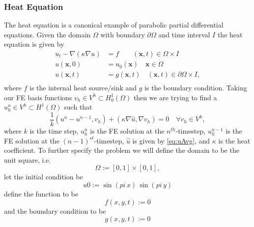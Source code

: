 \subsubsection{Heat Equation} \label{sss:Heat}
    The heat equation is a canonical example of parabolic partial differential
    equations. Given the domain $\Omega$ with boundary $\partial \Omega$ and
    time interval $I$ the heat equation is given by
    \begin{equation}
        \begin{split}
            u_t - \nabla \left( \kappa \nabla u \right) &= f
                \qquad (\mathbf{x}, t)\in \Omega \times I \\
            u(\mathbf{x}, 0) &= u_0(\mathbf{x}) \quad \mathbf{x} \in \Omega \\
            u(\mathbf{x}, t) &= g(\mathbf{x},t) \quad (\mathbf{x}, t)\in
                \partial\Omega \times I, \\
        \end{split}
        \label{eq:Heat}
    \end{equation}
    where $f$ is the internal heat source/sink and $g$ is the boundary
    condition. Taking our FE basis functions $v_h\in V^h\subset H^1_0(\Omega)$
    then we are trying to find a $u^n_h \in V^h \subset H^1(\Omega)$ such that
    \begin{equation}
        \frac{1}{k} (u^n - u^{n-1}, v_h) + (\kappa \nabla \hat{u}, \nabla v_h) =
        0 \quad \forall v_h \in V^h,
        \label{eq:WeakHeat}
    \end{equation}
    where $k$ is the time step, $u^n_h$ is the FE solution at the
    $n^{th}$-timestep, $u^{n-1}_h$ is the FE solution at the
    $(n-1)^{st}$-timestep, $\hat{u}$ is given by \eqref{eq:uAvg}, and $\kappa$
    is the heat coefficient. To further
    specify the problem we will define the domain to be the unit square, i.e.
    \begin{equation}
        \Omega := [0, 1] \times [0, 1],
        \label{eq:HeatDomain}
    \end{equation}
    let the initial condition be
    \begin{equation}
        u0 := \sin(pi\, x)\, \sin(pi\, y)
        \label{eq:HeatIC}
    \end{equation}
    define the function to be
    \begin{equation}
        f(x,y,t) := 0
        \label{eq:HeatSource}
    \end{equation}
    and the boundary condition to be
    \begin{equation}
        g(x,y,t) := 0
        \label{eq:HeatBC}
    \end{equation}

